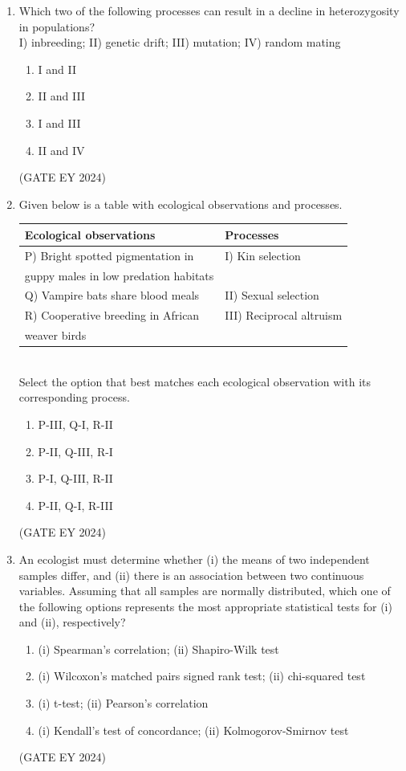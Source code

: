 \documentclass[journal]{IEEEtran}
\begin{document}
\begin{enumerate}
\item Which two of the following processes can result in a decline in heterozygosity in populations? \\
I) inbreeding; II) genetic drift; III) mutation; IV) random mating
    \begin{multicols}{2}
    \begin{enumerate}
        \item I and II
        \item II and III
        \item I and III
        \item II and IV
    \end{enumerate}
    \end{multicols}
\hfill{(GATE EY 2024)}

\item Given below is a table with ecological observations and processes. 
\begin{tabular}{|l|l|}
\hline
\textbf{Ecological observations} & \textbf{Processes} \\
\hline
P) Bright spotted pigmentation in & I) Kin selection \\
guppy males in low predation habitats & \\
\hline
Q) Vampire bats share blood meals & II) Sexual selection \\
\hline
R) Cooperative breeding in African & III) Reciprocal altruism \\
weaver birds & \\
\hline
\end{tabular} \\
Select the option that best matches each ecological observation with its corresponding process.
    \begin{multicols}{2}
    \begin{enumerate}
        \item P-III, Q-I, R-II
        \item P-II, Q-III, R-I
        \item P-I, Q-III, R-II
        \item P-II, Q-I, R-III
    \end{enumerate}
    \end{multicols}
\hfill{(GATE EY 2024)}

\item An ecologist must determine whether (i) the means of two independent samples differ, and (ii) there is an association between two continuous variables. Assuming that all samples are normally distributed, which one of the following options represents the most appropriate statistical tests for (i) and (ii), respectively?
    \begin{enumerate}
        \item (i) Spearman's correlation; (ii) Shapiro-Wilk test
        \item (i) Wilcoxon's matched pairs signed rank test; (ii) chi-squared test
        \item (i) t-test; (ii) Pearson's correlation
        \item (i) Kendall's test of concordance; (ii) Kolmogorov-Smirnov test
    \end{enumerate}
\hfill{(GATE EY 2024)}


\end{enumerate}
\end{document}
